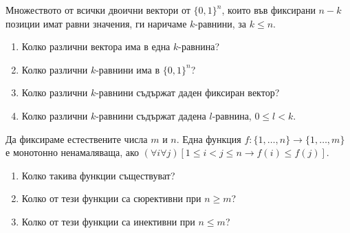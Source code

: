 \begin{problem}
  Множеството от всички двоични вектори от $\{0,1\}^{n}$, които във фиксирани $n-k$ позиции имат равни значения,
  ги наричаме $k$-равнини, за $k\leq n$.
  \begin{enumerate}
  \item
    Колко различни вектора има в една $k$-равнина?
  \item
    Колко различни $k$-равнини има в $\{0,1\}^{n}$?
  \item
    Колко различни $k$-равнини съдържат даден фиксиран вектор?
  \item
    Колко различни $k$-равнини съдържат дадена $l$-равнина, $0\leq l < k$.
  \end{enumerate}
\end{problem}


\begin{problem}
  Да фиксираме естествените числа $m$ и $n$.
  Една функция $f:\{1,\dots,n\}\to\{1,\dots,m\}$ е монотонно ненамаляваща, ако
  $(\forall i\forall j)[1\leq i<j\leq n \rightarrow f(i)\leq f(j) ]$.
  \begin{enumerate}
  \item
    Колко такива функции съществуват?
  \item
    Колко от тези функции са сюрективни при $n\geq m$?
  \item
    Колко от тези функции са инективни при $n\leq m$?
\end{enumerate}
\end{problem}


